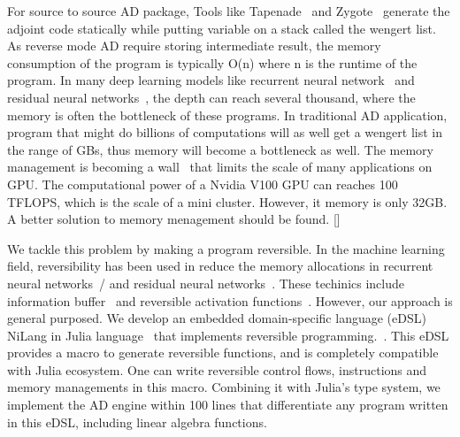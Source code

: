 \documentclass[aps,twocolumn,longbibliography,english,superscriptaddress]{revtex4-1}
\newcommand{\<}{\langle}
\renewcommand{\>}{\rangle}
\newcommand{\blue}[1]{[{\bf  \color{blue}{JG: #1}}]}
\theoremstyle{definition}\newtheorem{definition}{\textit{Definition}}
\begin{document}
    For source to source AD package, Tools like Tapenade~\cite{Hascoet2013} and Zygote~\cite{Innes2018, Innes2019} generate the adjoint code statically while putting variable on a stack called the wengert list.
    As reverse mode AD require storing intermediate result, the memory consumption of the program is typically O(n) where n is the runtime of the program. In many deep learning models like recurrent neural network~\cite{Lipton2015} and residual neural networks~\cite{He2016}, the depth can reach several thousand, where the memory is often the bottleneck of these programs. In traditional AD application, program that might do billions of computations will as well get a wengert list in the range of GBs, thus memory will become a bottleneck as well.
The memory management is becoming a wall~\cite{Luo2019} that limits the scale of many applications on GPU. The computational power of a Nvidia V100 GPU can reaches 100 TFLOPS, which is the scale of a mini cluster. However, it memory is only 32GB. A better solution to memory menagement should be found.
    \blue{@MLS, Do you have any good comments about starving CPU, i.e. memory accessing is consuming much more time than computing itself.
    This is why caching itermediate result is a performance killer.}



    We tackle this problem by making a program reversible. In the machine learning field, reversibility has been used in reduce the memory allocations in recurrent neural networks~/\cite{MacKay2018} and residual neural networks~\cite{Behrmann2018}. These techinics include information buffer~\cite{Maclaurin2015} and reversible activation functions~\cite{Gomez2017,Jacobsen2018}. However, our approach is general purposed. We develop an embedded domain-specific language (eDSL) NiLang in Julia language~\cite{Bezanson2012,Bezanson2017} that implements reversible programming.~\cite{Perumalla2013,Frank2017}.
    This eDSL provides a macro to generate reversible functions, and is completely compatible with Julia ecosystem. One can write reversible control flows, instructions and memory managements in this macro. Combining it with Julia's type system, we implement the AD engine within 100 lines that differentiate any program written in this eDSL, including linear algebra functions.
\end{document}
